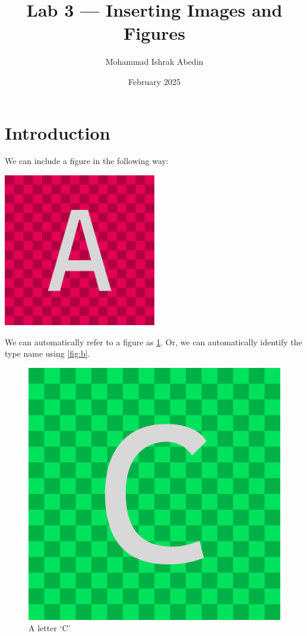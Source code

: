 \documentclass[a4paper, 11pt]{article}
\title{Lab 3 --- Inserting Images and Figures}
\author{Mohammad Ishrak Abedin}
\date{February 2025}
\begin{document}
\maketitle

\section{Introduction}
We can include a figure in the following way:

\begin{flushright}
    \includegraphics[width=0.5\textwidth, angle=45]{ImageA}
\end{flushright}

\kant[1-2] We can automatically refer to a figure as \ref{fig:b}. Or, we can automatically identify the type name using \autoref{fig:b}.

\begin{figure}[H]
    \centering
    \includegraphics[width=0.5\linewidth]{ImageC}
    \caption{A letter `C'}
    \label{fig:b}
\end{figure}

\kant[2-3]
\end{document}

